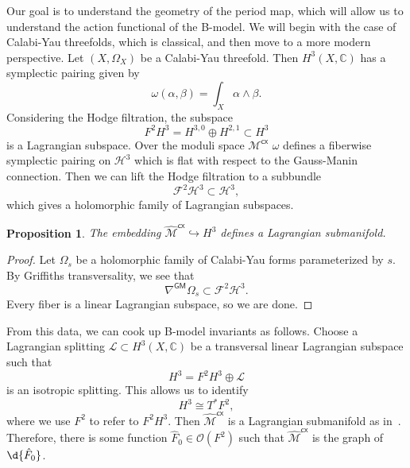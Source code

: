 \documentclass{amsart}
\newtheorem{prop}[thm]{Proposition}
\theoremstyle{definition}
\theoremstyle{remark}
\theoremstyle{plain}
\theoremstyle{definition}
\theoremstyle{remark}
\newcommand{\C}{\mathbb{C}}
\newcommand{\mc}[1]{\mathcal{#1}}
\newcommand{\ms}[1]{\mathsf{#1}}
\newcommand{\1}{\mathbf{1}}
\newcommand{\2}{\mathbf{2}}
\newcommand{\3}{\mathbf{3}}
\begin{document}
Our goal is to understand the geometry of the period map, which will allow us to understand the action functional of the B-model. We will begin with the case of Calabi-Yau threefolds, which is classical, and then move to a more modern perspective. Let \((X, \Omega_X)\) be a Calabi-Yau threefold. Then \(H^3(X, \C)\) has a symplectic pairing given by
\[ \omega(\alpha, \beta) = \int_X \alpha \wedge \beta. \]
Considering the Hodge filtration, the subspace
\[ F^2 H^3 = H^{3,0} \oplus H^{2,1} \subset H^3 \]
is a Lagrangian subspace. Over the moduli space \(\mc{M}^{\ms{cx}}\) \(\omega\) defines a fiberwise symplectic pairing on \(\mc{H}^3\) which is flat with respect to the Gauss-Manin connection. Then we can lift the Hodge filtration to a subbundle
\[ \mc{F}^2 \mc{H}^3 \subset \mc{H}^3, \]
which gives a holomorphic family of Lagrangian subspaces. 

\begin{prop}
    The embedding \(\hat{\mc{M}}^{\ms{cx}} \hookrightarrow H^3\) defines a Lagrangian submanifold.
\end{prop}

\begin{proof}
    Let \(\Omega_s\) be a holomorphic family of Calabi-Yau forms parameterized by \(s\). By Griffiths transversality, we see that
    \[ \nabla^{\ms{GM}} \Omega_s \subset \mc{F}^2 \mc{H}^3. \]
    Every fiber is a linear Lagrangian subspace, so we are done.
\end{proof}

From this data, we can cook up B-model invariants as follows. Choose a Lagrangian splitting \(\mc{L} \subset H^3(X, \C)\) be a transversal linear Lagrangian subspace such that
\[ H^3 = F^2 H^3 \oplus \mc{L} \]
is an isotropic splitting. This allows us to identify
\[ H^3 \cong T^* F^2, \]
where we use \(F^2\) to refer to \(F^2 H^3\). Then \(\hat{\mc{M}}^{\ms{cx}}\) is a Lagrangian submanifold as in~. Therefore, there is some function \(\hat{F}_0 \in \mc{O}(F^2)\) such that \(\hat{\mc{M}}^{\ms{cx}}\) is the graph of \(\d{\hat{F}_0}\). 
\end{document}
